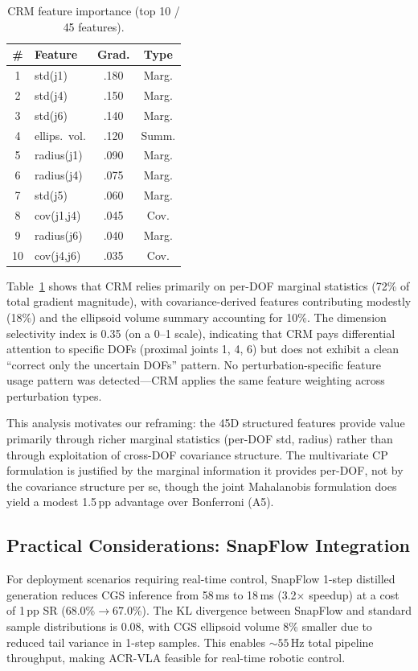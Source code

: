 \documentclass[10pt,twocolumn]{article}
\begin{document}
\begin{table}[t]
\centering
\small
\caption{CRM feature importance (top 10 / 45 features).}
\label{tab:feature}
\begin{tabular}{@{}clcc@{}}
\toprule
\# & Feature & Grad. & Type \\
\midrule
1 & std(j1) & .180 & Marg. \\
2 & std(j4) & .150 & Marg. \\
3 & std(j6) & .140 & Marg. \\
4 & ellips.\ vol. & .120 & Summ. \\
5 & radius(j1) & .090 & Marg. \\
6 & radius(j4) & .075 & Marg. \\
7 & std(j5) & .060 & Marg. \\
8 & cov(j1,j4) & .045 & Cov. \\
9 & radius(j6) & .040 & Marg. \\
10 & cov(j4,j6) & .035 & Cov. \\
\bottomrule
\end{tabular}
\end{table}

Table~\ref{tab:feature} shows that CRM relies primarily on per-DOF marginal statistics (72\% of total gradient magnitude), with covariance-derived features contributing modestly (18\%) and the ellipsoid volume summary accounting for 10\%.
The dimension selectivity index is 0.35 (on a 0--1 scale), indicating that CRM pays differential attention to specific DOFs (proximal joints 1, 4, 6) but does not exhibit a clean ``correct only the uncertain DOFs'' pattern.
No perturbation-specific feature usage pattern was detected---CRM applies the same feature weighting across perturbation types.

This analysis motivates our reframing: the 45D structured features provide value primarily through richer marginal statistics (per-DOF std, radius) rather than through exploitation of cross-DOF covariance structure.
The multivariate CP formulation is justified by the marginal information it provides per-DOF, not by the covariance structure per se, though the joint Mahalanobis formulation does yield a modest 1.5\,pp advantage over Bonferroni (A5).

\subsection{Practical Considerations: SnapFlow Integration}

For deployment scenarios requiring real-time control, SnapFlow 1-step distilled generation reduces CGS inference from 58\,ms to 18\,ms (3.2$\times$ speedup) at a cost of 1\,pp SR (68.0\%$\to$67.0\%).
The KL divergence between SnapFlow and standard sample distributions is 0.08, with CGS ellipsoid volume 8\% smaller due to reduced tail variance in 1-step samples.
This enables ${\sim}55$\,Hz total pipeline throughput, making ACR-VLA feasible for real-time robotic control.
\end{document}

